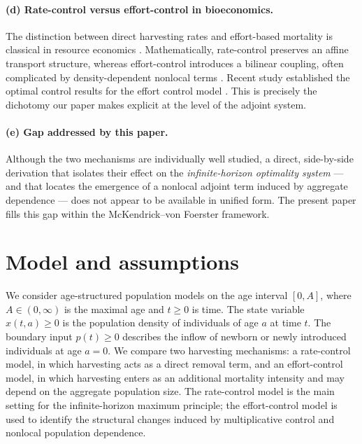 \documentclass[pdflatex,sn-mathphys-num]{sn-jnl}
\theoremstyle{definition}
\theoremstyle{remark}
\begin{document}
\paragraph{(d) Rate-control versus effort-control in bioeconomics.}
The distinction between direct harvesting rates and effort-based mortality
is classical in resource economics
\citep{clark_economics_1973,clark_economics_1975,clark_mathematical_2010,yu2026fullcovariance,%
getz_population_1989,reed_optimal_1979,tahvonen_economics_2009}. Mathematically, rate-control preserves an affine
transport structure, whereas effort-control introduces a bilinear coupling,
often complicated by density-dependent nonlocal terms
\citep{boucekkine_optimal_2013,wang2025multi}. 
Recent study established the optimal control results for the effort control model \cite{yu2026size}.
This is precisely the dichotomy our paper
makes explicit at the level of the adjoint system.

\paragraph{(e) Gap addressed by this paper.}
Although the two mechanisms are individually well studied, a direct,
side-by-side derivation that isolates their effect on the
\emph{infinite-horizon optimality system} --- and that locates the emergence
of a nonlocal adjoint term induced by aggregate dependence --- does not
appear to be available in unified form. The present paper fills this gap
within the McKendrick--von Foerster framework.


\section{Model and assumptions}
\label{sec:model}

We consider age-structured population models on the age interval $[0,A]$,
where $A\in(0,\infty)$ is the maximal age and $t\ge0$ is time. The state
variable $x(t,a)\ge0$ is the population density of individuals of age $a$ at
time $t$. The boundary input $p(t)\ge0$ describes the inflow of newborn or
newly introduced individuals at age $a=0$. We compare two harvesting
mechanisms: a rate-control model, in which harvesting acts as a direct
removal term, and an effort-control model, in which harvesting enters as an
additional mortality intensity and may depend on the aggregate population
size. The rate-control model is the main setting for the infinite-horizon
maximum principle; the effort-control model is used to identify the
structural changes induced by multiplicative control and nonlocal population
dependence.
\end{document}
